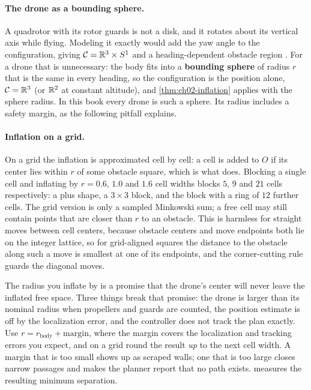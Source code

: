 \paragraph{The drone as a bounding sphere.}
A quadrotor with its rotor guards is not a disk, and it rotates about its vertical axis while flying. Modeling it exactly would add the yaw angle to the configuration, giving $\mathcal{C}=\mathbb{R}^3\times S^1$ and a heading-dependent obstacle region \cite{lavalle2006planning}. For a drone that is unnecessary: the body fits into a \textbf{bounding sphere} of radius $r$ that is the same in every heading, so the configuration is the position alone, $\mathcal{C}=\mathbb{R}^3$ (or $\mathbb{R}^2$ at constant altitude), and \cref{thm:ch02-inflation} applies with the sphere radius. In this book every drone is such a sphere. Its radius includes a safety margin, as the following pitfall explains.

\paragraph{Inflation on a grid.}
On a grid the inflation is approximated cell by cell: a cell is added to $O$ if its center lies within $r$ of some obstacle square, which is what  does. Blocking a single cell and inflating by $r=0.6$, $1.0$ and $1.6$ cell widths blocks $5$, $9$ and $21$ cells respectively: a plus shape, a $3\times3$ block, and the block with a ring of $12$ further cells. The grid version is only a sampled Minkowski sum; a free cell may still contain points that are closer than $r$ to an obstacle. This is harmless for straight moves between cell centers, because obstacle centers and move endpoints both lie on the integer lattice, so for grid-aligned squares the distance to the obstacle along such a move is smallest at one of its endpoints, and the corner-cutting rule guards the diagonal moves.

\begin{pitfall}
The radius you inflate by is a promise that the drone's center will never leave the inflated free space. Three things break that promise: the drone is larger than its nominal radius when propellers and guards are counted, the position estimate is off by the localization error, and the controller does not track the plan exactly. Use $r = r_{\text{body}} + \text{margin}$, where the margin covers the localization and tracking errors you expect, and on a grid round the result \emph{up} to the next cell width. A margin that is too small shows up as scraped walls; one that is too large closes narrow passages and makes the planner report that no path exists.  measures the resulting minimum separation.
\end{pitfall}

